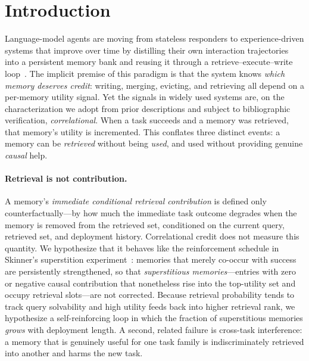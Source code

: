 \section{Introduction}

Language-model agents are moving from stateless responders to experience-driven
systems that improve over time by distilling their own interaction trajectories
into a persistent memory bank and reusing it through a retrieve--execute--write
loop~. The implicit premise of this paradigm is that
the system knows \emph{which memory deserves credit}: writing, merging, evicting,
and retrieving all depend on a per-memory utility signal. Yet the signals in
widely used systems are, on the characterization we adopt from prior descriptions
and subject to bibliographic verification, \emph{correlational}. When a task
succeeds and a memory was retrieved, that memory's utility is incremented. This
conflates three distinct events: a memory can be \emph{retrieved} without being
\emph{used}, and used without providing genuine \emph{causal} help.

\paragraph{Retrieval is not contribution.}
A memory's \emph{immediate conditional retrieval contribution} is defined only
counterfactually---by how much the immediate task outcome degrades when the memory
is removed from the retrieved set, conditioned on the current query, retrieved set,
and deployment history. Correlational credit does not measure this quantity. We
hypothesize that it behaves like the reinforcement
schedule in Skinner's superstition experiment~:
memories that merely co-occur with success are persistently strengthened, so that
\emph{superstitious memories}---entries with zero or negative causal
contribution that nonetheless rise into the top-utility set and occupy retrieval
slots---are not corrected. Because retrieval probability tends to track query
solvability and high utility feeds back into higher retrieval rank, we hypothesize a
self-reinforcing loop in which the fraction of superstitious memories \emph{grows}
with deployment length. A second, related failure is cross-task interference: a
memory that is genuinely useful for one task family is indiscriminately retrieved
into another and harms the new task.

